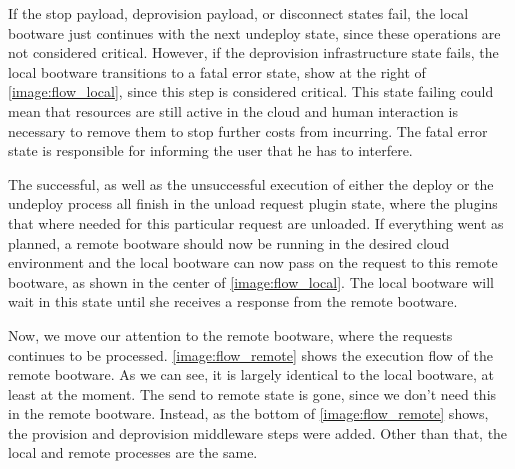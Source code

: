 If the stop payload, deprovision payload, or disconnect states fail, the local bootware just continues with the next undeploy state, since these operations are not considered critical.
However, if the deprovision infrastructure state fails, the local bootware transitions to a fatal error state, show at the right of \autoref{image:flow_local}, since this step is considered critical.
This state failing could mean that resources are still active in the cloud and human interaction is necessary to remove them to stop further costs from incurring.
The fatal error state is responsible for informing the user that he has to interfere.

The successful, as well as the unsuccessful execution of either the deploy or the undeploy process all finish in the unload request plugin state, where the plugins that where needed for this particular request are unloaded.
If everything went as planned, a remote bootware should now be running in the desired cloud environment and the local bootware can now pass on the request to this remote bootware, as shown in the center of \autoref{image:flow_local}.
The local bootware will wait in this state until she receives a response from the remote bootware.

Now, we move our attention to the remote bootware, where the requests continues to be processed.
\autoref{image:flow_remote} shows the execution flow of the remote bootware.
As we can see, it is largely identical to the local bootware, at least at the moment.
The send to remote state is gone, since we don't need this in the remote bootware.
Instead, as the bottom of \autoref{image:flow_remote} shows, the provision and deprovision middleware steps were added.
Other than that, the local and remote processes are the same.

